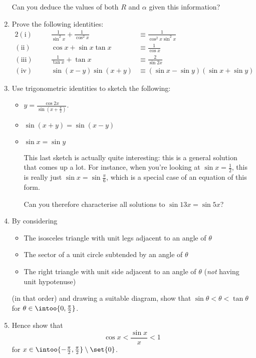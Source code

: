 \begin{enumerate}
  Can you deduce the values of both \(R\) and \(\alpha\) given this information?
 \item
  Prove the following identities:
  \begin{alignat*}2
   (\mathrm{i})&&\quad\frac 1{\sin^2 x} + \frac 1{\cos^2 x}
   &\equiv \frac 1{\cos^2 x \sin^2 x} \\
   (\mathrm{ii})&&\quad\cos x + \sin x \tan x
   &\equiv \frac 1{\cos x} \\
   (\mathrm{iii})&&\quad\frac 1{\tan x} + \tan x
   &\equiv \frac 2{\sin 2x} \\
   (\mathrm{iv})&&\quad\sin(x - y) \sin(x + y)
   &\equiv (\sin x - \sin y)(\sin x + \sin y)
  \end{alignat*}
 \item
  Use trigonometric identities to sketch the following:
  \begin{itemize}
   \item
    \(\displaystyle y = \frac{\cos 2x}{\sin(x + \frac \pi 2)}\).
   \item
    \(\sin(x + y) = \sin(x - y)\)
   \item
    \(\sin x = \sin y\)

    This last sketch is actually quite interesting: this is a general solution
    that comes up a lot. For instance, when you're looking at
    \(\sin x = \frac 12\), this is really just \(\sin x = \sin \frac \pi 6\),
    which is a special case of an equation of this form.

    Can you therefore characterise all solutions to \(\sin 13x = \sin 5x\)?
  \end{itemize}
 \item
  By considering
  \begin{itemize}
   \item
    The isosceles triangle with unit legs adjacent to an angle of \(\theta\)
   \item
    The sector of a unit circle subtended by an angle of \(\theta\)
   \item
    The right triangle with unit side adjacent to an angle of \(\theta\)
    (\emph{not} having unit hypotenuse)
  \end{itemize}
  (in that order) and drawing a suitable diagram, show that
  \(\sin \theta < \theta < \tan \theta\) for
  \(\theta \in \intoo{0, \frac \pi 2}\).
 \item
  Hence show that
  \begin{equation*}
   \cos x < \frac{\sin x}x < 1
  \end{equation*}
  for \(x \in \intoo{-\frac \pi 2, \frac \pi 2} \setminus \set{0}\).


\end{enumerate}
